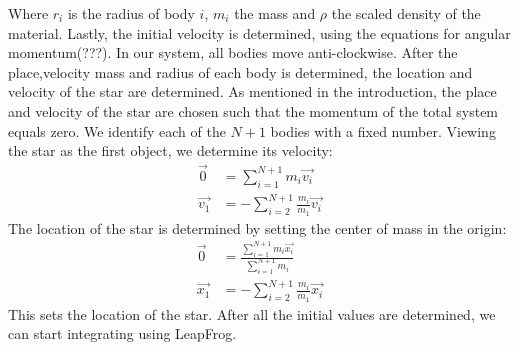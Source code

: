 Where \(r_i\) is the radius of body \(i\), \(m_i\) the mass and \(\rho\) the scaled density of the material.
Lastly, the initial velocity is determined, using the equations for angular momentum(???). 
In our system, all bodies move anti-clockwise. 
After the place,velocity mass and radius of each body is determined, the location and velocity of the star are determined. 
As mentioned in the introduction, the place and velocity of the star are chosen such that the momentum of the total system equals zero.
We identify each of the \(N+1\) bodies with a fixed number. Viewing the star  as the first object, we determine its velocity:
\begin{align*}
	\vec{0}&=\sum_{i=1}^{N+1}m_i\vec{v_i}\\
	\vec{v_1}&=-\sum_{i=2}^{N+1}\frac{m_i}{m_1}\vec{v_i}
\end{align*}
The location of the star is determined by setting the center of mass in the origin:
\begin{align*}
	\vec{0}&=\frac{\sum_{i=1}^{N+1}m_i\vec{x_i}}{\sum_{i=1}^{N+1}m_i}\\
	\vec{x_1}&=-\sum_{i=2}^{N+1}\frac{m_i}{m_1}\vec{x_i}
\end{align*}
This sets the location of the star.
After all the initial values are determined, we can start integrating using LeapFrog.
